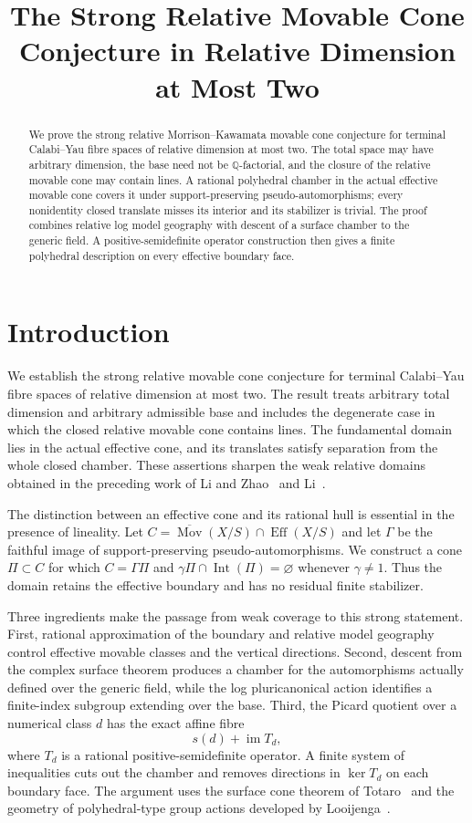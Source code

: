 \documentclass[11pt]{article}
\title{The Strong Relative Movable Cone Conjecture in Relative Dimension at Most Two}
\author{}
\date{}
\DeclareMathOperator{\Eff}{Eff}
\DeclareMathOperator{\Mov}{Mov}
\DeclareMathOperator{\Int}{Int}
\begin{document}
\maketitle
\begin{abstract}
We prove the strong relative Morrison--Kawamata movable cone conjecture for terminal
Calabi--Yau fibre spaces of relative dimension at most two. The total space may have
arbitrary dimension, the base need not be $\mathbb Q$-factorial, and the closure of the
relative movable cone may contain lines. A rational polyhedral chamber in the actual
effective movable cone covers it under support-preserving pseudo-automorphisms;
every nonidentity closed translate misses its interior and its stabilizer is trivial.
The proof combines relative log model geography with descent of a surface chamber
to the generic field. A positive-semidefinite operator construction then gives a
finite polyhedral description on every effective boundary face.
\end{abstract}

\section*{Introduction}
We establish the strong relative movable cone conjecture for terminal Calabi--Yau
fibre spaces of relative dimension at most two. The result treats arbitrary total
dimension and arbitrary admissible base and includes the degenerate case in which
the closed relative movable cone contains lines. The fundamental domain lies in
the actual effective cone, and its translates satisfy separation from the whole
closed chamber. These assertions sharpen the weak relative domains obtained in
the preceding work of Li and Zhao~\cite{LiZhao} and Li~\cite{LiII}.

The distinction between an effective cone and its rational hull is essential in
the presence of lineality. Let $C=\overline{\Mov}(X/S)\cap\Eff(X/S)$ and let
$\Gamma$ be the faithful image of support-preserving pseudo-automorphisms. We
construct a cone $\Pi\subset C$ for which $C=\Gamma\Pi$ and
$\gamma\Pi\cap\Int(\Pi)=\varnothing$ whenever $\gamma\ne1$. Thus the domain
retains the effective boundary and has no residual finite stabilizer.

Three ingredients make the passage from weak coverage to this strong statement.
First, rational approximation of the boundary and relative model geography
control effective movable classes and the vertical directions. Second, descent
from the complex surface theorem produces a chamber for the automorphisms
actually defined over the generic field, while the log pluricanonical action
identifies a finite-index subgroup extending over the base. Third, the Picard
quotient over a numerical class $d$ has the exact affine fibre
\[
  s(d)+\operatorname{im}T_d,
\]
where $T_d$ is a rational positive-semidefinite operator. A finite system of
inequalities cuts out the chamber and removes directions in $\ker T_d$ on each
boundary face. The argument uses the surface cone theorem of Totaro~\cite{Totaro}
and the geometry of polyhedral-type group actions developed by
Looijenga~\cite{Looijenga}.
\end{document}
